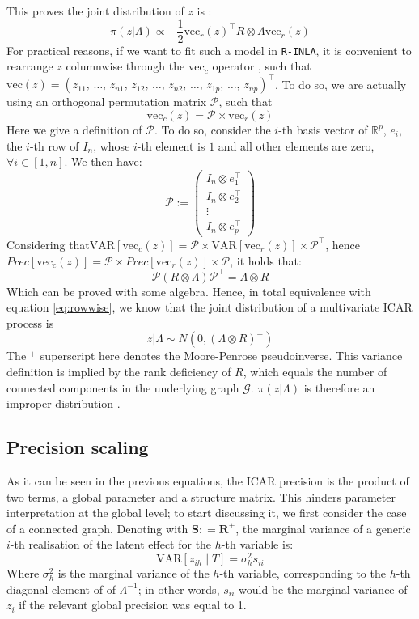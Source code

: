 \documentclass[openany]{book}
\begin{document}
This proves the joint distribution of $z$ is \citep[][this latter case regarding the PCAR]{Mardia, Banerjee, Gelfand}:
\begin{equation}
\pi(z  | \Lambda) \propto -\frac{1}{2} \mathrm{vec}_r(z) ^{\top} R \otimes \Lambda \mathrm{vec}_r(z)
\label{eq:rowwise}
\end{equation}
For practical reasons, if we want to fit such a model in \texttt{R-INLA}, it is convenient to rearrange $z$ columnwise through the $\mathrm{vec}_c$ operator \cite{INLAMSM}, such that $\mathrm{vec}(z) = (z_{11},\, \ldots, \,z_{n1},\, z_{12},\, \ldots,\, z_{n2},\, \ldots ,\, z_{1p}, \,\ldots, \,z_{np} )^{\top}$. To do so, we are actually using an orthogonal permutation matrix $\mathcal{P}$, such that 
$$\mathrm{vec}_c(z) = \mathcal{P} \times \mathrm{vec}_r(z)$$
Here we give a definition of $\mathcal{P}$. To do so, consider the $i$-th basis vector of $\mathbb{R}^p$, $e_i$, the $i$-th row of $I_n$, whose $i$-th element is $1$ and all other elements are zero, $\forall i \in [1,n]$. We then have:
$$
\mathcal{P}  := \begin{pmatrix} 
I_n \otimes e_1^{\top} \\ I_n \otimes e_2^{\top} \\ \vdots \\ I_n \otimes e_p^{\top}
\end{pmatrix}
$$
%
Considering that$
\mathrm{VAR}[\mathrm{vec}_c(z)] = \mathcal{P} \times \mathrm{VAR}[\mathrm{vec}_r(z)] \times \mathcal{P}^{\top}$, hence ${Prec}[\mathrm{vec}_c(z)] = \mathcal{P} \times {Prec}[\mathrm{vec}_r(z)] \times \mathcal{P}$, it holds that:
$$
\mathcal{P} \left( R \otimes \Lambda \right) \mathcal{P}^{\top}= \Lambda \otimes R
$$
Which can be proved with some algebra. Hence, in total equivalence with equation \ref{eq:rowwise}, we know that the joint distribution of a multivariate ICAR process is
%
\begin{equation}
z|\Lambda \sim N \left( 0, (\Lambda \otimes R)^{+}\right)
\end{equation}
%
The $^{+}$ superscript here denotes the Moore-Penrose pseudoinverse. This variance definition is implied by the rank deficiency of $R$, which equals the number of connected components in the underlying graph $\mathcal{G}$. $\pi(z | \Lambda)$ is therefore an improper distribution \citep[see e.g.][]{ICAR, Hodges2003}.

\subsection{Precision scaling}
As it can be seen in the previous equations, the ICAR precision is the product of two terms, a global parameter and a structure matrix. This hinders parameter interpretation at the global level; to start discussing it, we first consider the case of a connected graph. Denoting with $\mathbf{S} : = \mathbf{R}^{+}$, the marginal variance of a generic $i$-th realisation of the latent effect for the $h$-th variable is: 
$$
\mathrm{VAR}[z_{ih} \mid T] = \sigma_{h}^2 s_{ii}
$$
Where $\sigma_h^2$ is the marginal variance of the $h$-th variable, corresponding to the $h$-th diagonal element of of $\Lambda^{-1}$; in other words, $s_{ii}$ would be the marginal variance of $z_i$ if the relevant global precision was equal to 1.
\end{document}
